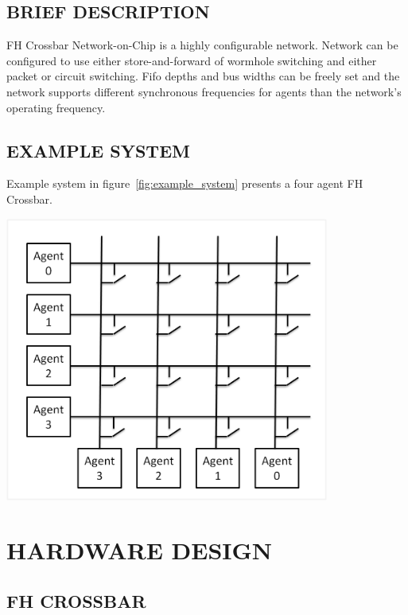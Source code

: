 \documentclass[a4paper,10pt,oneside,final]{article}
\begin{document}
\subsection{BRIEF DESCRIPTION}

FH Crossbar Network-on-Chip is a highly configurable network. Network can
be configured to use either store-and-forward of wormhole switching and
either packet or circuit switching. Fifo depths and bus widths can be
freely set and the network supports different synchronous frequencies
for agents than the network's operating frequency.

\subsection{EXAMPLE SYSTEM}

Example system in figure~\ref{fig:example_system} presents a four
agent FH Crossbar.


\begin{center}  
  \includegraphics[width=0.8\textwidth]{pic/example_system.png}
  \label{fig:example_system}
\end{center}



\newpage
\section{HARDWARE DESIGN}

\subsection{FH CROSSBAR}
\end{document}
